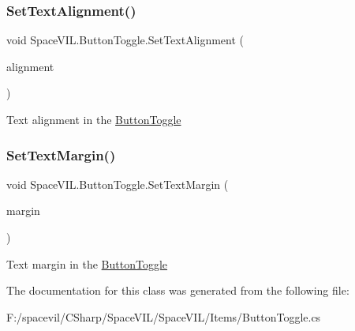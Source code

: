 \subsubsection{\texorpdfstring{Set\+Text\+Alignment()}{SetTextAlignment()}}
{\footnotesize\ttfamily void Space\+V\+I\+L.\+Button\+Toggle.\+Set\+Text\+Alignment (\begin{DoxyParamCaption}\item[{Item\+Alignment}]{alignment }\end{DoxyParamCaption})\hspace{0.3cm}{\ttfamily [inline]}}



Text alignment in the \mbox{\hyperlink{class_space_v_i_l_1_1_button_toggle}{Button\+Toggle}} 

\mbox{\label{class_space_v_i_l_1_1_button_toggle_a387ba36cf18f799bbb64615e4925f160}} 
\subsubsection{\texorpdfstring{Set\+Text\+Margin()}{SetTextMargin()}}
{\footnotesize\ttfamily void Space\+V\+I\+L.\+Button\+Toggle.\+Set\+Text\+Margin (\begin{DoxyParamCaption}\item[{\mbox{\hyperlink{struct_space_v_i_l_1_1_decorations_1_1_indents}{Indents}}}]{margin }\end{DoxyParamCaption})\hspace{0.3cm}{\ttfamily [inline]}}



Text margin in the \mbox{\hyperlink{class_space_v_i_l_1_1_button_toggle}{Button\+Toggle}} 



The documentation for this class was generated from the following file\+:\begin{DoxyCompactItemize}
\item 
F\+:/spacevil/\+C\+Sharp/\+Space\+V\+I\+L/\+Space\+V\+I\+L/\+Items/Button\+Toggle.\+cs\end{DoxyCompactItemize}

